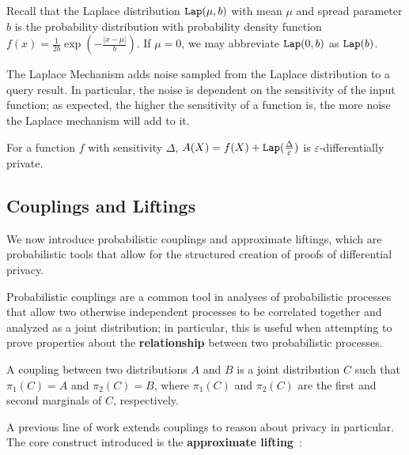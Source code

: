 Recall that the Laplace distribution $\texttt{Lap}(\mu, b)$ with mean $\mu$ and spread parameter $b$ is the probability distribution with probability density function $f(x) = \frac{1}{2b}\exp(-\frac{|x-\mu|}{b})$. If $\mu =0$, we may abbreviate $\texttt{Lap}(0, b)$ as $\texttt{Lap}(b)$. 

The Laplace Mechanism adds noise sampled from the Laplace distribution to a query result. In particular, the noise is dependent on the sensitivity of the input function; as expected, the higher the sensitivity of a function is, the more noise the Laplace mechanism will add to it.   

\begin{thm}
    For a function $f$ with sensitivity $\Delta$, $A(X) = f(X) + \texttt{Lap}(\frac{\Delta}{\varepsilon})$ is $\varepsilon$-differentially private. 
\end{thm}

\subsection{Couplings and Liftings}

We now introduce probabilistic couplings and approximate liftings, which are probabilistic tools that allow for the structured creation of proofs of differential privacy.

Probabilistic couplings are a common tool in analyses of probabilistic processes that allow two otherwise independent processes to be correlated together and analyzed as a joint distribution; in particular, this is useful when attempting to prove properties about the \textbf{relationship} between two probabilistic processes. 

\begin{defn}[Couplings]
    A coupling between two distributions $A$ and $B$ is a joint distribution $C$ such that $\pi_1(C)=A$ and $\pi_2(C)=B$, where $\pi_1(C)$ and $\pi_2(C)$ are the first and second marginals of $C$, respectively. 
\end{defn}

A previous line of work extends couplings to reason about privacy in particular. The core construct introduced is the \textbf{approximate lifting}~\cite{bartheProvingDifferentialPrivacy2016,bartheDifferentialPrivacyComposition2013,hsuProbabilisticCouplingsProbabilistic2017,albarghouthiConstraintBasedSynthesisCoupling2018,albarghouthiSynthesizingCouplingProofs2017}:

